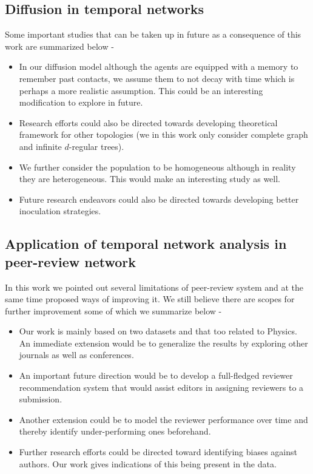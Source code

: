 \subsection{Diffusion in temporal networks} 
Some important studies that can be taken up in future as a consequence of this work are summarized below - 
\begin{itemize}
\item In our diffusion model although the agents are equipped with a memory to remember past contacts, we assume them to not decay with time which is perhaps a more realistic assumption. This could be an interesting modification to explore in future.
\item Research efforts could also be directed towards developing theoretical framework for other topologies (we in this work only consider complete graph and infinite $d$-regular trees).
\item We further consider the population to be homogeneous although in reality they are heterogeneous. This would make an interesting study as well.
\item Future research endeavors could also be directed towards developing better inoculation strategies.
\end{itemize}

\subsection{Application of temporal network analysis in peer-review network}
In this work we pointed out several limitations of peer-review system and at the same time proposed ways of improving it. We still believe there are scopes for further improvement some of which we summarize below - 
\begin{itemize}
 \item Our work is mainly based on two datasets and that too related to Physics. An immediate extension would be to generalize the results by exploring other journals as well as conferences.
 \item An important future direction would be to develop a full-fledged reviewer recommendation system that would assist editors in assigning reviewers to a submission.
 \item Another extension could be to model the reviewer performance over time and thereby identify under-performing ones beforehand.
 \item Further research efforts could be directed toward identifying biases against authors. Our work gives indications of this being present in the data.
\end{itemize}

